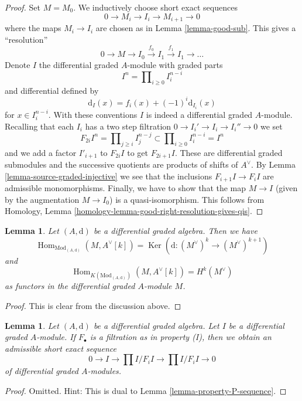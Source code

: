 \documentclass{stacks-project}
\theoremstyle{plain}
\newtheorem{lemma}[subsection]{Lemma}
\theoremstyle{definition}
\theoremstyle{remark}
\numberwithin{equation}{subsection}
\def\Hom{\mathop{\mathrm{Hom}}\nolimits}
\def\Ker{\mathop{\mathrm{Ker}}}
\begin{document}
\begin{proof}
Set $M = M_0$. We inductively choose short exact sequences
$$
0 \to M_i \to I_i \to M_{i + 1} \to 0
$$
where the maps $M_i \to I_i$ are chosen as in Lemma \ref{lemma-good-sub}.
This gives a ``resolution''
$$
0 \to M \to I_0 \xrightarrow{f_0} I_1 \xrightarrow{f_1} I_1 \to \ldots
$$
Denote $I$ the differential graded $A$-module with graded parts
$$
I^n = \prod\nolimits_{i \geq 0} I^{n - i}_i
$$
and differential defined by
$$
\text{d}_I(x) = f_i(x) + (-1)^i \text{d}_{I_i}(x)
$$
for $x \in I_i^{n - i}$. With these conventions $I$ is indeed a differential
graded $A$-module. Recalling that each $I_i$ has a two step filtration
$0 \to I_i' \to I_i \to I_i'' \to 0$ we set
$$
F_{2i}I^n = \prod\nolimits_{j \geq i} I^{n - j}_j
\subset
\prod\nolimits_{i \geq 0} I^{n - i}_i = I^n
$$
and we add a factor $I'_{i + 1}$ to $F_{2i}I$ to get $F_{2i + 1}I$.
These are differential graded submodules and the successive quotients
are products of shifts of $A^\vee$. By
Lemma \ref{lemma-source-graded-injective} we see that
the inclusions $F_{i + 1}I \to F_iI$ are admissible monomorphisms.
Finally, we have to show that the map $M \to I$ (given by the
augmentation $M \to I_0$) is a quasi-isomorphism. This follows from
Homology, Lemma \ref{homology-lemma-good-right-resolution-gives-qis}.
\end{proof}

\begin{lemma}
\label{lemma-hom-into-shift-dual-free}
Let $(A, \text{d})$ be a differential graded algebra. Then we have
$$
\Hom_{\text{Mod}_{(A, \text{d})}}(M, A^\vee[k]) =
\Ker(\text{d} : (M^\vee)^k \to (M^\vee)^{k + 1})
$$
and
$$
\Hom_{K(\text{Mod}_{(A, \text{d})})}(M, A^\vee[k]) = H^k(M^\vee)
$$
as functors in the differential graded $A$-module $M$.
\end{lemma}

\begin{proof}
This is clear from the discussion above.
\end{proof}

\begin{lemma}
\label{lemma-property-I-sequence}
Let $(A, \text{d})$ be a differential graded algebra.
Let $I$ be a differential graded $A$-module. If $F_\bullet$
is a filtration as in property (I), then we obtain an
admissible short exact sequence
$$
0 \to I \to
\prod\nolimits I/F_iI \to
\prod\nolimits I/F_iI \to 0
$$
of differential graded $A$-modules.
\end{lemma}

\begin{proof}
Omitted. Hint: This is dual to Lemma \ref{lemma-property-P-sequence}.
\end{proof}
\end{document}
